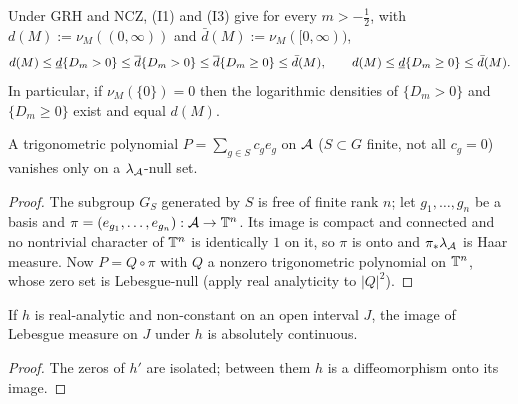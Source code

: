 Under GRH and NCZ, (I1) and (I3) give for every $m>-\frac12$, with $d(M):=\nu_M((0,\infty))$ and $\bar d(M):=\nu_M([0,\infty))$,
\begin{equation}\label{eq:sandwich}
d(M)\le\underline d\{D_m>0\}\le\overline d\{D_m>0\}\le\overline d\{D_m\ge0\}\le\bar d(M),\qquad d(M)\le\underline d\{D_m\ge0\}\le\bar d(M).
\end{equation}
In particular, if $\nu_M(\{0\})=0$ then the logarithmic densities of $\{D_m>0\}$ and $\{D_m\ge0\}$ exist and equal $d(M)$.

\begin{lemma}[\rd{1 read}]\label{lem:trigpoly}
A trigonometric polynomial $P=\sum_{g\in S}c_ge_g$ on $\mathcal A$ ($S\subset G$ finite, not all $c_g=0$) vanishes only on a $\lambda_{\mathcal A}$-null set.
\end{lemma}

\begin{proof}
The subgroup $G_S$ generated by $S$ is free of finite rank $n$; let $g_1,\dots,g_n$ be a basis and $\pi=(e_{g_1},\dots,e_{g_n}):\mathcal A\to\mathbb T^n$. Its image is compact and connected and no nontrivial character of $\mathbb T^n$ is identically $1$ on it, so $\pi$ is onto and $\pi_*\lambda_{\mathcal A}$ is Haar measure. Now $P=Q\circ\pi$ with $Q$ a nonzero trigonometric polynomial on $\mathbb T^n$, whose zero set is Lebesgue-null (apply real analyticity to $|Q|^2$).
\end{proof}

\begin{lemma}[\rd{1 read}]\label{lem:analytic}
If $h$ is real-analytic and non-constant on an open interval $J$, the image of Lebesgue measure on $J$ under $h$ is absolutely continuous.
\end{lemma}

\begin{proof}
The zeros of $h'$ are isolated; between them $h$ is a diffeomorphism onto its image.
\end{proof}
